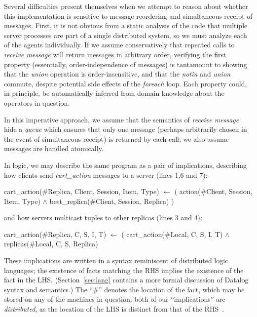 Several difficulties present themselves when we attempt to reason about whether
this implementation is sensitive to message reordering and simultaneous receipt of messages.
First, it is not obvious from a static analysis of the code that multiple server processes are
part of a single distributed system, so we must analyze each of the agents individually.
If we assume conservatively that repeated calls to {\em receive message} will return messages in
arbitrary order, verifying the first property (essentially, order-independence of messages)
is tantamount to showing that the {\em union} operation is
order-insensitive, and that the {\em notin} and {\em union} commute, despite potential
side effects of the {\em foreach} loop.  Each property could, in principle, be automatically inferred
from domain knowledge about the operators in question.

In this imperative approach, we assume that the semantics of {\em receive message}
hide a {\em queue} which ensures that only one message (perhaps arbitrarily chosen in the
event of simultaneous receipt) is returned by each call; we also assume messages are handled atomically.


In logic, we may describe the same program
as a pair of implications, describing how clients send {\em cart\_action}
messages to a server (lines 1,6 and 7):

\begin{Dedalus}
cart\_action(#Replica, Client, Session, Item, Type)
  \(\leftarrow\) ( action(#Client, Session, Item, Type) \(\land\)
       best_replica(#Client, Session, Replica) )
\end{Dedalus}

\noindent and how servers multicast tuples to other replicas (lines 3 and 4):

\begin{Dedalus}
cart\_action(#Replica, C, S, I, T)
  \(\leftarrow\) ( cart\_action(#Local, C, S, I, T) \(\land\)
       replicas(#Local, C, S, Replica)
\end{Dedalus}

These implications are written in a syntax reminiscent of distributed
logic languages; the existence of facts matching the RHS implies the
existence of the fact in the LHS.  (Section~\ref{sec:lang}
contains a more formal discussion of Datalog syntax and semantics.)
The ``\#'' denotes the location of the fact, which may be stored on
any of the machines in question; both of our ``implications'' are {\em
  distributed}, as the location of the LHS is distinct from that of the
RHS~\cite{Loo2009-CACM}.  

